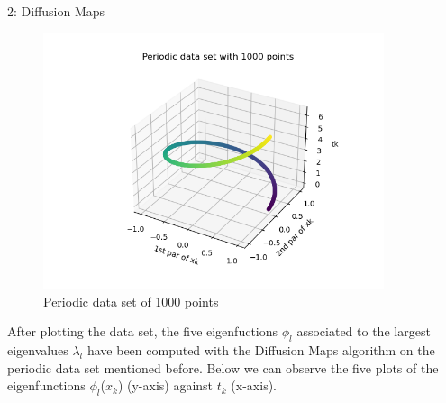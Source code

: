 \documentclass[10pt,a4paper]{article}
\begin{document}
\begin{task}{2: Diffusion Maps}
\begin{figure} [H]
    \centering
    \includegraphics[width=10cm]{images/Dataset.png}
    \caption{Periodic data set of 1000 points}
    \label{fig:task2-1-1}
\end{figure}

After plotting the data set, the five eigenfuctions \(\phi_l \) associated to the largest eigenvalues \(\lambda_l \) have been computed with the Diffusion Maps algorithm on the periodic data set mentioned before. Below we can observe the five plots of the eigenfunctions \(\phi_l\)(\(x_k\)) (y-axis) against \(t_k\) (x-axis). 

\begin{figure} [H]
\centering
    \label{s}
\end{figure}


\end{task}
\end{document}
